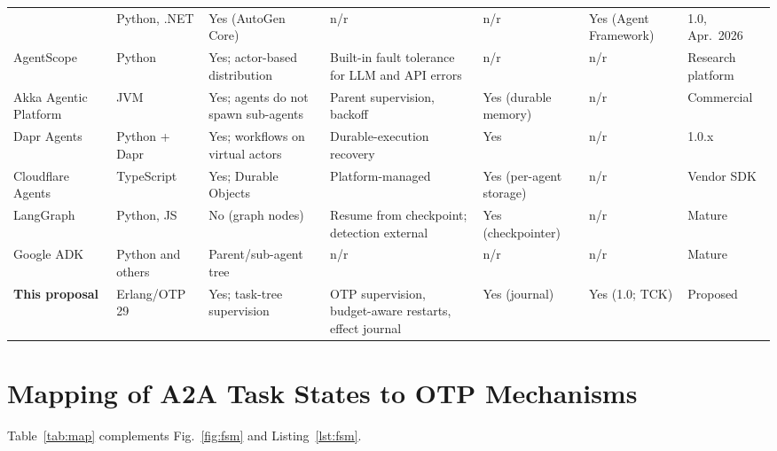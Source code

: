 \documentclass[conference,letterpaper]{IEEEtran}
\begin{document}
\begin{table}[!h]
\begin{tabularx}{\textwidth}{@{}P{2.9cm}P{1.6cm}YYYP{2.3cm}P{1.9cm}@{}}
 & Python, .NET & Yes (AutoGen Core) & n/r & n/r & Yes (Agent Framework)
 & 1.0, Apr.~2026 \\
AgentScope~\cite{gao2024} & Python & Yes; actor-based distribution
 & Built-in fault tolerance for LLM and API errors & n/r & n/r
 & Research platform \\
Akka Agentic Platform~\cite{akka2025,akka-capabilities,akka-patterns}
 & JVM & Yes; agents do not spawn sub-agents & Parent supervision, backoff
 & Yes (durable memory) & n/r & Commercial \\
Dapr Agents~\cite{dapr-agents,dapr-docs} & Python + Dapr & Yes; workflows
 on virtual actors & Durable-execution recovery & Yes & n/r & 1.0.x \\
Cloudflare Agents~\cite{cloudflare-agents} & TypeScript & Yes; Durable
 Objects & Platform-managed & Yes (per-agent storage) & n/r & Vendor SDK \\
LangGraph~\cite{langgraph-durable,diagrid2025} & Python, JS & No (graph
 nodes) & Resume from checkpoint; detection external & Yes (checkpointer)
 & n/r & Mature \\
Google ADK~\cite{adk-multi} & Python and others & Parent/sub-agent tree
 & n/r & n/r & n/r & Mature \\
\midrule
\textbf{This proposal} & Erlang/OTP 29 & Yes; task-tree supervision
 & OTP supervision, budget-aware restarts, effect journal & Yes (journal)
 & Yes (1.0; TCK) & Proposed \\
\bottomrule
\end{tabularx}
\end{table}

\clearpage
\section{Mapping of A2A Task States to OTP Mechanisms}\label{app:map}

Table~\ref{tab:map} complements Fig.~\ref{fig:fsm} and
Listing~\ref{lst:fsm}.
\end{document}
